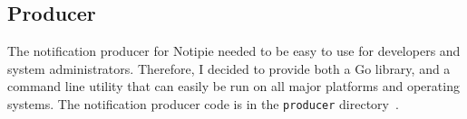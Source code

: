 \subsection{Producer}\label{sec:producer}

The notification producer for Notipie
needed to be easy to use for developers
and system administrators.
Therefore,
I decided to provide both a Go library,
and a command line utility
that can easily be run on all major platforms
and operating systems.
The notification producer code
is in the
\texttt{producer} directory~\cite{sewera_notipie_2022-4}.



